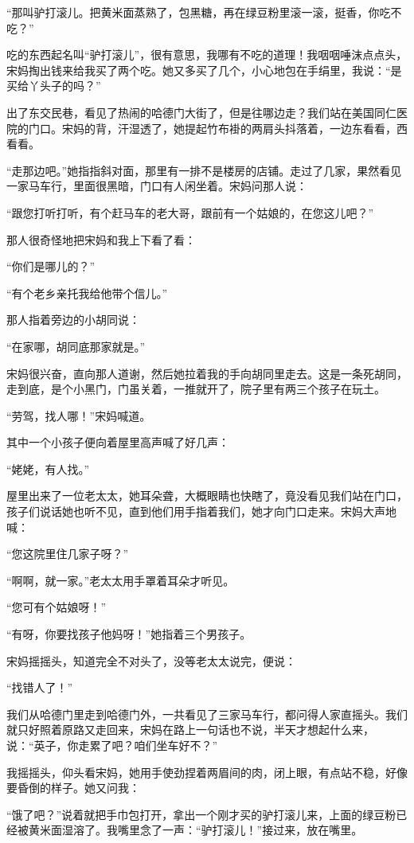 \par “那叫驴打滚儿。把黄米面蒸熟了，包黑糖，再在绿豆粉里滚一滚，挺香，你吃不吃？”
\par 吃的东西起名叫“驴打滚儿”，很有意思，我哪有不吃的道理！我咽咽唾沫点点头，宋妈掏出钱来给我买了两个吃。她又多买了几个，小心地包在手绢里，我说：“是买给丫头子的吗？”
\par 出了东交民巷，看见了热闹的哈德门大街了，但是往哪边走？我们站在美国同仁医院的门口。宋妈的背，汗湿透了，她提起竹布褂的两肩头抖落着，一边东看看，西看看。
\par “走那边吧。”她指指斜对面，那里有一排不是楼房的店铺。走过了几家，果然看见一家马车行，里面很黑暗，门口有人闲坐着。宋妈问那人说：
\par “跟您打听打听，有个赶马车的老大哥，跟前有一个姑娘的，在您这儿吧？”
\par 那人很奇怪地把宋妈和我上下看了看：
\par “你们是哪儿的？”
\par “有个老乡亲托我给他带个信儿。”
\par 那人指着旁边的小胡同说：
\par “在家哪，胡同底那家就是。”
\par 宋妈很兴奋，直向那人道谢，然后她拉着我的手向胡同里走去。这是一条死胡同，走到底，是个小黑门，门虽关着，一推就开了，院子里有两三个孩子在玩土。
\par “劳驾，找人哪！”宋妈喊道。
\par 其中一个小孩子便向着屋里高声喊了好几声：
\par “姥姥，有人找。”
\par 屋里出来了一位老太太，她耳朵聋，大概眼睛也快瞎了，竟没看见我们站在门口，孩子们说话她也听不见，直到他们用手指着我们，她才向门口走来。宋妈大声地喊：
\par “您这院里住几家子呀？”
\par “啊啊，就一家。”老太太用手罩着耳朵才听见。
\par “您可有个姑娘呀！”
\par “有呀，你要找孩子他妈呀！”她指着三个男孩子。
\par 宋妈摇摇头，知道完全不对头了，没等老太太说完，便说：
\par “找错人了！”
\par 我们从哈德门里走到哈德门外，一共看见了三家马车行，都问得人家直摇头。我们就只好照着原路又走回来，宋妈在路上一句话也不说，半天才想起什么来，说：“英子，你走累了吧？咱们坐车好不？”
\par 我摇摇头，仰头看宋妈，她用手使劲捏着两眉间的肉，闭上眼，有点站不稳，好像要昏倒的样子。她又问我：
\par “饿了吧？”说着就把手巾包打开，拿出一个刚才买的驴打滚儿来，上面的绿豆粉已经被黄米面湿溶了。我嘴里念了一声：“驴打滚儿！”接过来，放在嘴里。
